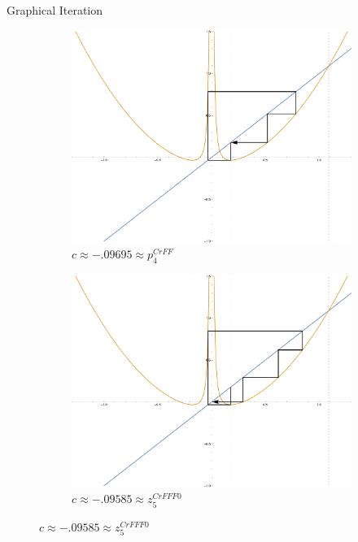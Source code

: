 \documentclass{beamer}
\newcommand{\<}{\left\langle}
\renewcommand{\>}{\right\rangle} %
\renewcommand{\*}{\cdot} %
\begin{document}
\begin{frame}[allowframebreaks]{Graphical Iteration}
\begin{figure}[ht]
		\begin{subfigure}[b]{.49\textwidth}
				\includegraphics[width=\textwidth]{./img/plot-009695}
				\caption{$c \approx -.09695 \approx p_4^{CrFF}$}
		\end{subfigure}
		\begin{subfigure}[b]{.49\textwidth}
				\includegraphics[width=\textwidth]{./img/plot-009585}
				\caption{$c \approx -.09585 \approx z_5^{CrFFF0}$}
		\end{subfigure}



\end{figure}
\end{frame}
\end{document}
